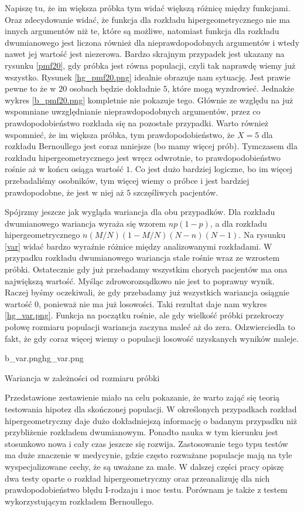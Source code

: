 Napiszę tu, że im większa próbka tym widać większą różnicę między funkcjami. Oraz zdecydowanie widać, że funkcja dla rozkładu hipergeometrycznego nie ma innych argumentów niż te, które są możliwe, natomiast funkcja dla rozkładu dwumianowego jest liczona również dla nieprawdopodobnych argumentów i wtedy nawet jej wartość jest niezerowa. Bardzo skrajnym przypadek jest ukazany na rysunku \ref{pmf20}, gdy próbka jest równa populacji, czyli tak naprawdę wiemy już wszystko. Rysunek \ref{hg_pmf20.png} idealnie obrazuje nam sytuację. Jest prawie pewne to że w $20$ osobach będzie dokładnie $5$, które mogą wyzdrowieć. Jednakże wykres \ref{b_pmf20.png} kompletnie nie pokazuje tego. Głównie ze względu na już wspomniane uwzględnianie nieprawdopodobnych argumentów, przez co prawdopodobieństwo rozkłada się na pozostałe przypadki. Warto również wspomnieć, że im większa próbka, tym prawdopodobieństwo, że $X=5$ dla rozkładu Bernoullego jest coraz mniejsze (bo mamy więcej prób). Tymczasem dla rozkładu hipergeometrycznego jest wręcz odwrotnie, to prawdopodobieństwo rośnie aż w końcu osiąga wartość $1$. Co jest dużo bardziej logiczne, bo im więcej przebadaliśmy osobników, tym więcej wiemy o próbce i jest bardziej prawdopodobne, że jest w niej aż $5$ szczęśliwych pacjentów.

Spójrzmy jeszcze jak wygląda wariancja dla obu przypadków. Dla rozkładu dwumianowego wariancja wyraża się wzorem $np(1-p)$, a dla rozkładu hipergeometrycznego $n(M/N)(1-M/N)(N-n)(N-1)$. Na rysunku \ref{var} widać bardzo wyraźnie różnice między analizowanymi rozkładami. W przypadku rozkładu dwumianowego wariancja stale rośnie wraz ze wzrostem próbki. Ostatecznie gdy już przebadamy wszystkim chorych pacjentów ma ona największą wartość. Myśląc zdroworozsądkowo nie jest to poprawny wynik. Raczej byśmy oczekiwali, że gdy przebadamy już wszystkich wariancja osiągnie wartość $0$, ponieważ nie ma już losowości. Taki rezultat daje nam wykres \ref{hg_var.png}. Funkcja na początku rośnie, ale gdy wielkość próbki przekroczy połowę rozmiaru populacji wariancja zaczyna maleć aż do zera. Odzwierciedla to fakt, że gdy coraz więcej wiemy o populacji losowość uzyskanych wyników maleje.

\begin{diagrams}{b_var.png}{hg_var.png}
	\caption{Wariancja w zależności od rozmiaru próbki}
	\label{var}
\end{diagrams}

Przedstawione zestawienie miało na celu pokazanie, że warto zająć się teorią testowania hipotez dla skończonej populacji. W określonych przypadkach rozkład hipergeometryczny daje dużo dokładniejszą informację o badanym przypadku niż przybliżenie rozkładem dwumianowym. Ponadto nauka w tym kierunku jest stosunkowo nowa i cały czas jeszcze się rozwija. Zastosowanie tego typu testów ma duże znaczenie w medycynie, gdzie często rozważane populacje mają na tyle wyspecjalizowane cechy, że są uważane za małe. W dalszej części pracy opiszę dwa testy oparte o rozkład hipergeometryczny oraz przeanalizuję dla nich prawdopodobieństwo błędu I-rodzaju i moc testu. Porównam je także z testem wykorzystującym rozkładem Bernoullego.
